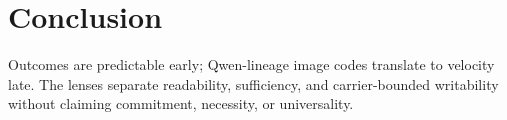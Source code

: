 \section{Conclusion}\label{sec:conclusion}

Outcomes are predictable early; Qwen-lineage image codes translate to velocity
late. The lenses separate readability, sufficiency, and carrier-bounded
writability without claiming commitment, necessity, or universality.
